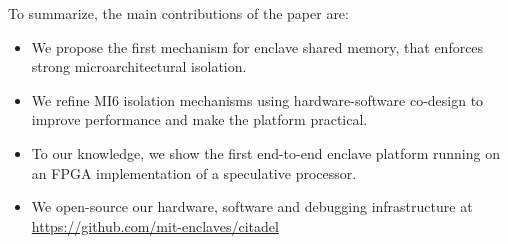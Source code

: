 To summarize, the main contributions of the paper are:
\begin{itemize}
\itemsep-0.1em
\item We propose the first mechanism for enclave shared memory, that enforces strong microarchitectural isolation.
\item We refine MI6 isolation mechanisms using hardware-software co-design to improve performance and make the platform practical.
\item To our knowledge, we show the first end-to-end enclave platform running on an FPGA implementation of a speculative processor.
\item We open-source our hardware, software and debugging infrastructure at 
\url{https://github.com/mit-enclaves/citadel}
\end{itemize}